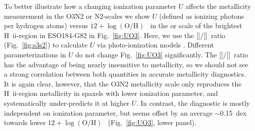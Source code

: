 \documentclass[traditabstract, referee]{aa}
\newcommand{\hii}{\mbox{H~{\sc ii}}}
\newcommand{\oh}{12+\log(\mathrm{O/H})}
\newcommand{\sii}{[\ion{S}{ii}]}
\newcommand{\siii}{[\ion{S}{iii}]}
\begin{document}
\begin{appendix}
To better illustrate how a changing ionization parameter $U$ affects the metallicity measurement in the O3N2 or N2-scales we show $U$ (defined as ionizing photons per hydrogen atoms) versus $\oh$~ in the \citet{2004MNRAS.348L..59P} or \citet{2016Ap&SS.361...61D} scale of the brightest \hii-region in ESO184-G82 in Fig.~\ref{fig:UO3}. Here, we use the \sii/\siii~ratio (Fig.~\ref{fig:s3s2}) to calculate $U$ via photo-ionization models \citep{2011MNRAS.415.3616D}. Different parameterizations in $U$ \citep[e.g.][]{2016A&A...594A..37M} do not change Fig.~\ref{fig:UO3} significantly. The \sii/\siii~ratio has the advantage of being nearly insensitive to metallicity, so we should not see a strong correlation between both quantities in accurate metallicity diagnostics. It is again clear, however, that the O3N2 metallicity scale only reproduces the \hii-region metallicity in spaxels with lower ionization parameter, and systematically under-predicts it at higher $U$. In contrast, the \citet{2016Ap&SS.361...61D} diagnostic is mostly independent on ionization parameter, but seems offset by an average $\sim$0.15~dex towards lower $\oh$~ (Fig.~\ref{fig:UO3}, lower panel).

\end{appendix}
\end{document}
